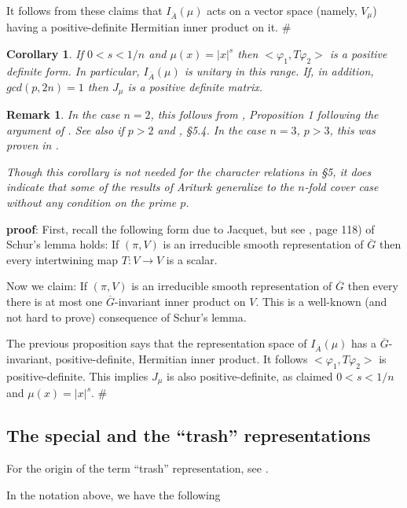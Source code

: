 \documentclass[twocolumn,10pt]{article}
\newtheorem{corollary}[theorem]{Corollary}
\newtheorem{remark}{Remark}
\begin{document}
It follows from these claims that 
$I_{\overline{A}}(\mu )$ acts on a vector space (namely, $V_\mu$)
having a positive-definite Hermitian inner product on it.
$\#$

\begin{corollary} 
If $0<s<1/n$ and $\mu (x)=|x|^s$ then 
$<\varphi _1,T\varphi _2>$ is a positive 
definite form. In
particular, $I_{\overline{A}}(\mu )$ is unitary in this range.
If, in addition, $gcd(p,2n)=1$ then $J_\mu $ is 
a positive definite matrix.
\end{corollary}

\begin{remark}
In the case $n=2$, this follows from \cite{GS}, 
Proposition 1 following the argument of \cite{Ar}. 
See also \cite{Mo1} if $p>2$ and \cite{G}, \S 5.4.
In the case $n=3$, $p >3 $, this was proven in \cite{Ar}. 

Though this corollary is not needed for the
character relations in \S 5, it does indicate that some of
the results of
Ariturk \cite{Ar} generalize to the $n$-fold cover case
without any condition on the prime $p$.
\end{remark}

{\bf proof}: First, recall the following form 
due to Jacquet, but see \cite{C}, page 118) of 
Schur's lemma holds: If $(\pi,V)$ is an irreducible smooth 
representation of $\overline{G}$ then every
intertwining map $T:V\rightarrow V$ is a scalar.

Now we claim: If $(\pi,V)$ is an irreducible smooth 
representation of $\overline{G}$ then every
there is at most one $\overline{G}$-invariant
inner product on $V$. This is a well-known (and not hard to prove)
consequence of Schur's lemma.

The previous proposition says that 
the representation space of $I_{\overline{A}}(\mu )$ 
has a $\overline{G}$-invariant, positive-definite,
Hermitian inner product. It follows
$<\varphi _1,T\varphi _2>$ is positive-definite.
This implies $J_\mu$ is also positive-definite, as claimed
$0<s<1/n$ and $\mu (x)=|x|^s$.
$\#$

\subsection{The special and the ``trash'' representations}
\label{subsec:special}

For the origin of the term ``trash'' representation,
see \cite{G}. 

In the notation above, we have the following
\end{document}
